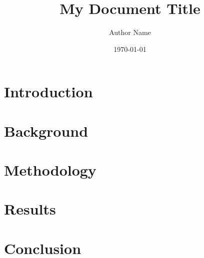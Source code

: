 \documentclass{report}
\begin{document}
\title{My Document Title}
\author{Author Name}
\date{\today}
\maketitle
\thispagestyle{empty} %

\tableofcontents
\newpage

\section{Introduction}
\lipsum[1] %

\section{Background}
\lipsum[2]

\section{Methodology}
\lipsum[3]

\section{Results}
\lipsum[4]

\section{Conclusion}
\lipsum[5]
\end{document}
